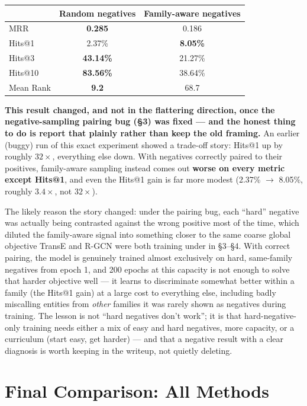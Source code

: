 \documentclass[11pt,a4paper]{article}
\begin{document}
\begin{center}
\begin{tabular}{lcc}
\toprule
& \textbf{Random negatives} & \textbf{Family-aware negatives} \\
\midrule
MRR & \textbf{0.285} & 0.186 \\
Hits@1 & 2.37\% & \textbf{8.05\%} \\
Hits@3 & \textbf{43.14\%} & 21.27\% \\
Hits@10 & \textbf{83.56\%} & 38.64\% \\
Mean Rank & \textbf{9.2} & 68.7 \\
\bottomrule
\end{tabular}
\end{center}

\begin{why}
\textbf{This result changed, and not in the flattering direction, once
the negative-sampling pairing bug (\S3) was fixed --- and the honest
thing to do is report that plainly rather than keep the old framing.} An
earlier (buggy) run of this exact experiment showed a trade-off story:
Hits@1 up by roughly $32\times$, everything else down. With negatives
correctly paired to their positives, family-aware sampling instead comes
out \textbf{worse on every metric except Hits@1}, and even the Hits@1
gain is far more modest (2.37\% $\to$ 8.05\%, roughly $3.4\times$, not
$32\times$).

The likely reason the story changed: under the pairing bug, each ``hard''
negative was actually being contrasted against the wrong positive most of
the time, which diluted the family-aware signal into something closer to
the same coarse global objective TransE and R-GCN were both training
under in \S3--\S4. With correct pairing, the model is genuinely trained
almost exclusively on hard, same-family negatives from epoch 1, and 200
epochs at this capacity is not enough to solve that harder objective well
--- it learns to discriminate somewhat better within a family (the
Hits@1 gain) at a large cost to everything else, including badly
miscalling entities from \emph{other} families it was rarely shown as
negatives during training. The lesson is not ``hard negatives don't
work''; it is that hard-negative-only training needs either a mix of easy
and hard negatives, more capacity, or a curriculum (start easy, get
harder) --- and that a negative result with a clear diagnosis is worth
keeping in the writeup, not quietly deleting.
\end{why}

\section{Final Comparison: All Methods}
\end{document}
